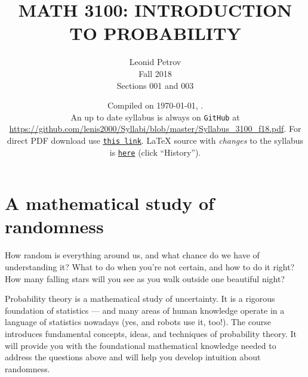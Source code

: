 \documentclass[oneside,11pt]{amsart}
\begin{document}
\title[MATH 3100: INTRODUCTION TO PROBABILITY]{MATH 3100: INTRODUCTION TO PROBABILITY}
\author{Leonid Petrov\\Fall 2018\\Sections 001 and 003}
\date{Compiled on \today, \currenttime.\\An up to date syllabus is always on \texttt{GitHub} at \url{https://github.com/lenis2000/Syllabi/blob/master/Syllabus_3100_f18.pdf}. For direct PDF download use \href{https://github.com/lenis2000/Syllabi/raw/master/Syllabus_3100_f18.pdf}{\texttt{this link}}.
	\LaTeX{} source with \textit{changes} to the syllabus is \href{https://github.com/lenis2000/Syllabi/blob/master/Syllabus_3100_f18.tex}{\texttt{here}}
(click ``History'').}
\maketitle

\bigskip

\section{A mathematical study of randomness}

How random is everything around us, and what chance do we have of understanding it? What to do when you're not certain, and how to do it right? How many falling stars will you see as you walk outside one beautiful night? 

Probability theory is a mathematical study of uncertainty. It is a rigorous foundation of statistics --- and many areas of human knowledge operate in a language of statistics nowadays (yes, and robots use it, too!). The course introduces fundamental concepts, ideas, and techniques of probability theory. It will provide you with the foundational mathematical knowledge needed to address the questions above and will help you develop intuition about randomness.
\end{document}
